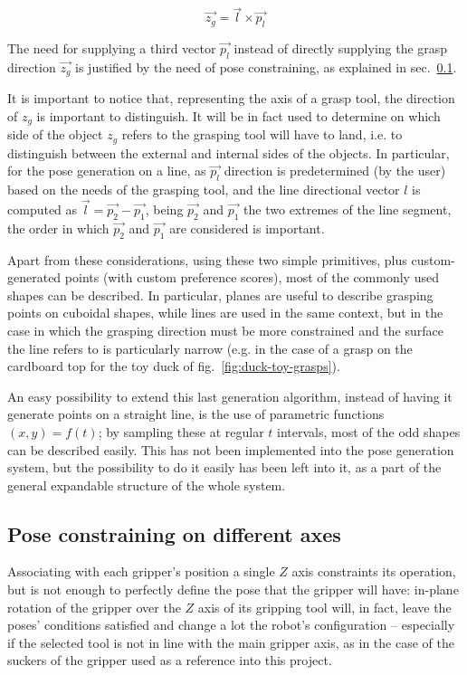 \begin{equation}
  \vec{z_{g}}=\vec{l} \times \vec{p_l}
\end{equation}

The need for supplying a third vector $\vec{p_l}$ instead of directly
supplying the grasp direction $\vec{z_g}$ is justified by the need of
pose constraining, as explained in sec.~\ref{sec:pose-constraining}.


It is important to notice that, representing the axis of a grasp tool,
the direction of $z_g$ is important to distinguish. It will be in fact
used to determine on which side of the object $z_g$ refers to the
grasping tool will have to land, i.e. to distinguish between the
external and internal sides of the objects. In particular, for the
pose generation on a line, as $\vec{p_l}$ direction is predetermined
(by the user) based on the needs of the grasping tool, and the line
directional vector $l$ is computed as $\vec{l}=\vec{p_2}-\vec{p_1}$,
being $\vec{p_2}$ and $\vec{p_1}$ the two extremes of the line
segment, the order in which $\vec{p_2}$ and $\vec{p_1}$ are considered
is important.

Apart from these considerations, using these two simple primitives,
plus custom-generated points (with custom preference scores), most of
the commonly used shapes can be described. In particular, planes are
useful to describe grasping points on cuboidal shapes, while lines are
used in the same context, but in the case in which the grasping
direction must be more constrained and the surface the line refers to
is particularly narrow (e.g. in the case of a grasp on the cardboard
top for the toy duck of fig.~\ref{fig:duck-toy-grasps}).

An easy possibility to extend this last generation algorithm, instead
of having it generate points on a straight line, is the use of
parametric functions $(x,y)=f(t)$; by sampling these at regular $t$
intervals, most of the odd shapes can be described easily. This has
not been implemented into the pose generation system, but the
possibility to do it easily has been left into it, as a part of the
general expandable structure of the whole system.

\subsection{Pose constraining on different axes} \label{sec:pose-constraining}
Associating with each gripper's position a single $Z$ axis constraints
its operation, but is not enough to perfectly define the pose that the
gripper will have: in-plane rotation of the gripper over the $Z$ axis
of its gripping tool will, in fact, leave the poses' conditions
satisfied and change a lot the robot's configuration -- especially if
the selected tool is not in line with the main gripper axis, as in the
case of the suckers of the gripper used as a reference into this
project.


